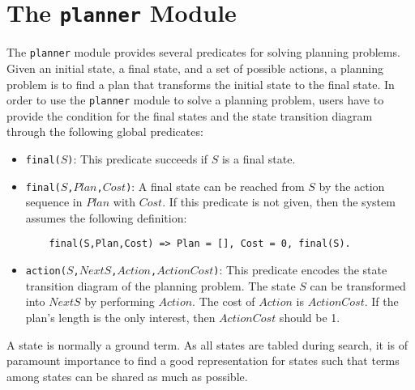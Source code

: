 \chapter{\label{chapter:planner}The \texttt{planner} Module}
The \texttt{planner} module provides several predicates for solving planning problems. Given an initial state, a final state, and a set of possible actions, a planning problem is to find a plan that transforms the initial state to the final state. In order to use the \texttt{planner} module to solve a planning problem, users have to provide the condition for the final states and the state transition diagram through the following global predicates:
\begin{itemize}
\item \texttt{final($S$)}: This predicate succeeds if $S$ is a final state.
\item \texttt{final($S$,$Plan$,$Cost$)}: A final state can be reached from $S$ by the action sequence in $Plan$ with $Cost$. If this predicate is not given, then the system assumes the following definition:
\begin{verbatim}
    final(S,Plan,Cost) => Plan = [], Cost = 0, final(S).
\end{verbatim}

\item \texttt{action($S$,$NextS$,$Action$,$ActionCost$)}: This predicate encodes the state transition diagram of the planning problem. The state $S$ can be transformed into $NextS$ by performing $Action$. The cost of $Action$ is $ActionCost$. If the plan's length is the only interest, then $ActionCost$ should be 1.
\end{itemize}

A state is normally a ground term. As all states are tabled during search, it is of paramount importance to find a good representation for states such that terms among states can be shared as much as possible.


